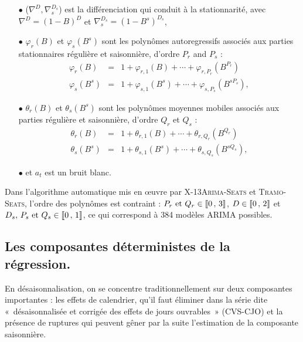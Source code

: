 \documentclass[12pt, a4paper, french]{article}
\begin{document}
\begin{itemize}
	\item[$\bullet$] ($\nabla^D, \nabla_s^{D_s}$) est la différenciation qui conduit à la stationnarité, avec $\nabla^D = (1-B)^D$ et $\nabla^{D_s}_s=(1-B^s)^{D_s}$,
	\item[$\bullet$] $\varphi_r (B)$  et $\varphi_s (B^s)$ sont les polynômes autoregressifs associés aux parties stationnaires régulière et saisonnière, d'ordre $P_r$ and $P_s$ : 
$$
\begin{array}{lcl}
\varphi_r (B)   & = & 1 + \varphi_{r,1} (B) + \cdots + \varphi_{r,P_r} (B^{P_r}) \\
\varphi_s (B^s) & = & 1 + \varphi_{s,1} (B^s) + \cdots + \varphi_{s,P_s} (B^{sP_s}),
\end{array}
$$
	\item[$\bullet$] $\theta_r (B)$  et $\theta_s (B^s)$ sont les polynômes moyennes mobiles associés aux parties régulière et saisonnière, d'ordre $Q_r$ et $Q_s$ : 
$$
\begin{array}{lcl}
\theta_r (B)   & = & 1 + \theta_{r,1} (B) + \cdots + \theta_{r,Q_r} (B^{Q_r}) \\
\theta_s (B^s) & = & 1 + \theta_{s,1} (B^s) + \cdots + \theta_{s,Q_s} (B^{sQ_s}),
\end{array}
$$
	\item[$\bullet$] et $a_t$ est un bruit blanc.
\end{itemize}

Dans l'algorithme automatique mis en œuvre par \textsc{X-13Arima-Seats} et \textsc{Tramo-Seats}, l'ordre des polynômes est contraint : $P_r\text{ et }Q_r\in \llbracket 0\,,\, 3 \rrbracket$, $D\in \llbracket 0\,,\, 2 \rrbracket$ et $D_s,\, P_s \text{ et } Q_s\in \llbracket 0\,,\, 1 \rrbracket$, ce qui correspond à 384 modèles ARIMA possibles. 


\subsection{Les composantes déterministes de la régression.}

En désaisonnalisation, on se concentre traditionnellement sur deux composantes importantes : les effets de calendrier, qu'il faut éliminer dans la série dite «~désaisonnalisée et corrigée des effets de jours ouvrables~» (CVS-CJO) et la présence de ruptures qui peuvent gêner par la suite l'estimation de la composante saisonnière.
\end{document}
